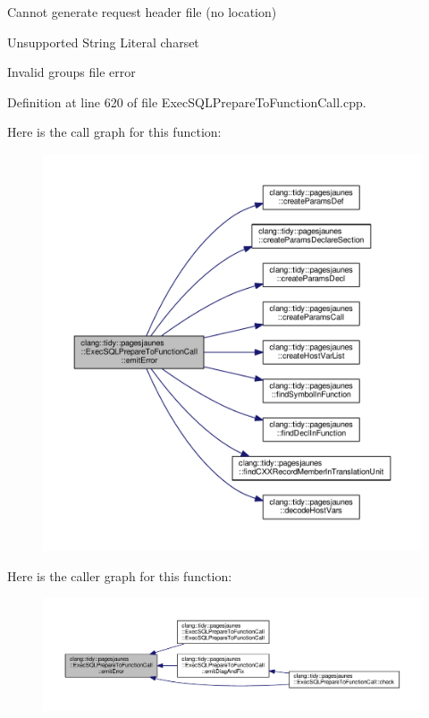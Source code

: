 Cannot generate request header file (no location)

Unsupported String Literal charset

Invalid groups file error 

Definition at line 620 of file Exec\+S\+Q\+L\+Prepare\+To\+Function\+Call.\+cpp.

Here is the call graph for this function\+:
\nopagebreak
\begin{figure}[H]
\begin{center}
\leavevmode
\includegraphics[width=350pt]{classclang_1_1tidy_1_1pagesjaunes_1_1_exec_s_q_l_prepare_to_function_call_a86fd460de74f1414467ab71679af689d_cgraph}
\end{center}
\end{figure}
Here is the caller graph for this function\+:
\nopagebreak
\begin{figure}[H]
\begin{center}
\leavevmode
\includegraphics[width=350pt]{classclang_1_1tidy_1_1pagesjaunes_1_1_exec_s_q_l_prepare_to_function_call_a86fd460de74f1414467ab71679af689d_icgraph}
\end{center}
\end{figure}
